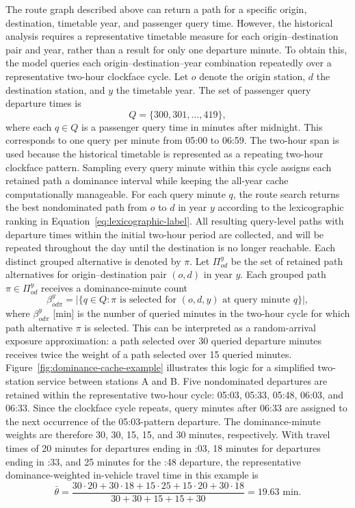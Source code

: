 \documentclass[preprint,12pt]{elsarticle}
\begin{document}
The route graph described above can return a path for a specific origin, destination, timetable year, and passenger query time. However, the historical analysis requires a representative timetable measure for each origin--destination pair and year, rather than a result for only one departure minute. To obtain this, the model queries each origin--destination--year combination repeatedly over a representative two-hour clockface cycle. Let $o$ denote the origin station, $d$ the destination station, and $y$ the timetable year. The set of passenger query departure times is
\begin{equation}
  Q=\{300,301,\ldots,419\},
  \label{eq:query-minute-set}
\end{equation}
where each $q\in Q$ is a passenger query time in minutes after midnight. This corresponds to one query per minute from 05:00 to 06:59. The two-hour span is used because the historical timetable is represented as a repeating two-hour clockface pattern. Sampling every query minute within this cycle assigns each retained path a dominance interval while keeping the all-year cache computationally manageable. For each query minute $q$, the route search returns the best nondominated path from $o$ to $d$ in year $y$ according to the lexicographic ranking in Equation~\eqref{eq:lexicographic-label}. All resulting query-level paths with departure times within the initial two-hour period are collected, and will be repeated throughout the day until the destination is no longer reachable. Each distinct grouped alternative is denoted by $\pi$. Let $\Pi^y_{od}$ be the set of retained path alternatives for origin--destination pair $(o,d)$ in year $y$. Each grouped path $\pi\in\Pi^y_{od}$ receives a dominance-minute count
\begin{equation}
  \beta^y_{od\pi}=\left|\{q\in Q: \pi \text{ is selected for } (o,d,y) \text{ at query minute } q\}\right|,
  \label{eq:part1-dominance-minutes}
\end{equation}
where $\beta^y_{od\pi}$ [min] is the number of queried minutes in the two-hour cycle for which path alternative $\pi$ is selected. This can be interpreted as a random-arrival exposure approximation: a path selected over 30 queried departure minutes receives twice the weight of a path selected over 15 queried minutes. Figure~\ref{fig:dominance-cache-example} illustrates this logic for a simplified two-station service between stations A and B. Five nondominated departures are retained within the representative two-hour cycle: 05:03, 05:33, 05:48, 06:03, and 06:33. Since the clockface cycle repeats, query minutes after 06:33 are assigned to the next occurrence of the 05:03-pattern departure. The dominance-minute weights are therefore 30, 30, 15, 15, and 30 minutes, respectively. With travel times of 20 minutes for departures ending in :03, 18 minutes for departures ending in :33, and 25 minutes for the :48 departure, the representative dominance-weighted in-vehicle travel time in this example is
\begin{equation}
  \bar\theta =
  \frac{30\cdot20+30\cdot18+15\cdot25+15\cdot20+30\cdot18}
  {30+30+15+15+30}
  =19.63\text{ min}.
  \label{eq:dominance-example-weighted-time}
\end{equation}
\end{document}
